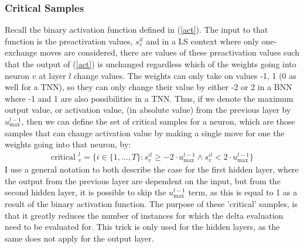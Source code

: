 \subsubsection{Critical Samples}
Recall the binary activation function defined in (\ref{act}). The input to that function is the preactivation values, $s_v^{il}$ and in a LS context where only one-exchange moves are considered, there are values of these preactivation values such that the output of (\ref{act}) is unchanged regardless which of the weights going into neuron $v$ at layer $l$ change values. The weights can only take on values -1, 1 (0 as well for a TNN), so they can only change their value by either -2 or 2 in a BNN where -1 and 1 are also possibilities in a TNN. Thus, if we denote the maximum output value, or activation value, (in absolute value) from the previous layer by $u^{l-1}_{\max}$, then we can define the set of critical samples for a neuron, which are those samples that can change activation value by making a single move for one the weights going into that neuron, by:
\begin{align}
    \label{critical} \text{critical }^l_ v = \{ i \in \{1, \ldots, T\}: s_v^{il} \geq -2 \cdot u^{l-1}_{\max} \wedge s_v^{il} < 2 \cdot u^{l-1}_{\max} \}
\end{align}
I use a general notation to both describe the case for the first hidden layer, where the output from the previous layer are dependent on the input, but from the second hidden layer, it is possible to skip the $u^{l-1}_{\max}$ term, as this is equal to 1 as a result of the binary activation function. The purpose of these 'critical' samples, is that it greatly reduces the number of instances for which the delta evaluation need to be evaluated for. This trick is only used for the hidden layers, as the same does not apply for the output layer. 

